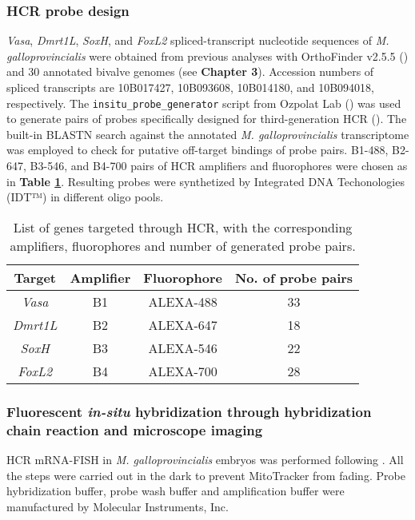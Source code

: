 \documentclass[../main.tex]{subfiles}
\begin{document}
\subsubsection{HCR probe design} \label{probedesign_MM}
\textit{Vasa}, \textit{Dmrt1L}, \textit{SoxH}, and \textit{FoxL2} spliced-transcript nucleotide sequences of \textit{M. galloprovincialis} were obtained from previous analyses with OrthoFinder v2.5.5 (\textbf{\cite{emms2019orthofinder}}) and 30 annotated bivalve genomes (see \textbf{Chapter 3}). Accession numbers of spliced transcripts are 10B017427, 10B093608, 10B014180, and 10B094018, respectively. The \verb|insitu_probe_generator| script from Ozpolat Lab (\textbf{\cite{kuehn2022probegenerator}}) was used to generate pairs of probes specifically designed for third-generation HCR (\textbf{\cite{choi2018hcr3}}). The built-in BLASTN search against the annotated \textit{M. galloprovincialis} transcriptome was employed to check for putative off-target bindings of probe pairs. B1-488, B2-647, B3-546, and B4-700 pairs of HCR amplifiers and fluorophores were chosen as in \textbf{Table \ref{tab:probes}}. Resulting probes were synthetized by Integrated DNA Techonologies (IDT™) in different oligo pools.

\begin{table}
    \centering
    \begin{tabular}{c c c c}
         \hline
         \textbf{Target} & \textbf{Amplifier} & \textbf{Fluorophore} & \textbf{No. of probe pairs} \\
         \hline
         \textit{Vasa} & B1 & ALEXA-488 & 33 \\
         \textit{Dmrt1L} & B2 & ALEXA-647 & 18 \\
         \textit{SoxH} & B3 & ALEXA-546 & 22 \\
         \textit{FoxL2} & B4 & ALEXA-700 & 28 \\
         \hline
    \end{tabular}
    \caption{List of genes targeted through HCR, with the corresponding amplifiers, fluorophores and number of generated probe pairs.}
    \label{tab:probes}
\end{table}

\subsubsection{Fluorescent \textit{in-situ} hybridization through hybridization chain reaction and microscope imaging} \label{chapter4_MM_hcrprotocol}
HCR mRNA-FISH in \textit{M. galloprovincialis} embryos was performed following \textbf{\cite{miglioli2024hcrMytilus}}. All the steps were carried out in the dark to prevent MitoTracker from fading. Probe hybridization buffer, probe wash buffer and amplification buffer were manufactured by Molecular Instruments, Inc.
\end{document}
